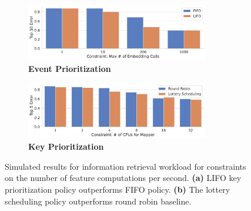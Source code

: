 \begin{figure}[t]
     \centering
     \begin{subfigure}[b]{0.5\textwidth}
         \centering
         \includegraphics[width=8cm]{ralf/figures/fifo_lifo_wiki_simulation.pdf}
         \caption{\textbf{Event Prioritization}}
         \label{fig:wiki-event-sim}
     \end{subfigure} %
     \begin{subfigure}[b]{0.5\textwidth}
         \centering
         \includegraphics[width=8cm]{ralf/figures/weighted_wiki_simiulation.pdf}
         \caption{\textbf{Key Prioritization}}
         \label{fig:wiki-key-sim}
     \end{subfigure}
        \caption{Simulated results for information retrieval workload for constraints on the number of feature computations per second. \textbf{(a)} LIFO key prioritization policy outperforms FIFO policy. \textbf{(b)} The lottery scheduling policy outperforms round robin baseline.
        }
    

\end{figure}
